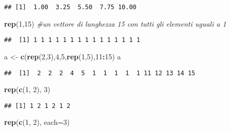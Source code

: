 \documentclass[
]{article}
\newenvironment{Shaded}{\begin{snugshade}}{\end{snugshade}}
\newcommand{\AttributeTok}[1]{\textcolor[rgb]{0.13,0.29,0.53}{#1}}
\newcommand{\CommentTok}[1]{\textcolor[rgb]{0.56,0.35,0.01}{\textit{#1}}}
\newcommand{\DecValTok}[1]{\textcolor[rgb]{0.00,0.00,0.81}{#1}}
\newcommand{\FunctionTok}[1]{\textcolor[rgb]{0.13,0.29,0.53}{\textbf{#1}}}
\newcommand{\NormalTok}[1]{#1}
\newcommand{\OtherTok}[1]{\textcolor[rgb]{0.56,0.35,0.01}{#1}}
\newcommand{\SpecialCharTok}[1]{\textcolor[rgb]{0.81,0.36,0.00}{\textbf{#1}}}
\begin{document}
\begin{verbatim}
## [1]  1.00  3.25  5.50  7.75 10.00
\end{verbatim}

\begin{Shaded}
\begin{Highlighting}[]
\FunctionTok{rep}\NormalTok{(}\DecValTok{1}\NormalTok{,}\DecValTok{15}\NormalTok{) }\CommentTok{\#un vettore di lunghezza 15 con tutti gli elementi uguali a 1}
\end{Highlighting}
\end{Shaded}

\begin{verbatim}
##  [1] 1 1 1 1 1 1 1 1 1 1 1 1 1 1 1
\end{verbatim}

\begin{Shaded}
\begin{Highlighting}[]
\NormalTok{a }\OtherTok{\textless{}{-}} \FunctionTok{c}\NormalTok{(}\FunctionTok{rep}\NormalTok{(}\DecValTok{2}\NormalTok{,}\DecValTok{3}\NormalTok{),}\DecValTok{4}\NormalTok{,}\DecValTok{5}\NormalTok{,}\FunctionTok{rep}\NormalTok{(}\DecValTok{1}\NormalTok{,}\DecValTok{5}\NormalTok{),}\DecValTok{11}\SpecialCharTok{:}\DecValTok{15}\NormalTok{)}
\NormalTok{a}
\end{Highlighting}
\end{Shaded}

\begin{verbatim}
##  [1]  2  2  2  4  5  1  1  1  1  1 11 12 13 14 15
\end{verbatim}

\begin{Shaded}
\begin{Highlighting}[]
\FunctionTok{rep}\NormalTok{(}\FunctionTok{c}\NormalTok{(}\DecValTok{1}\NormalTok{, }\DecValTok{2}\NormalTok{), }\DecValTok{3}\NormalTok{)}
\end{Highlighting}
\end{Shaded}

\begin{verbatim}
## [1] 1 2 1 2 1 2
\end{verbatim}

\begin{Shaded}
\begin{Highlighting}[]
\FunctionTok{rep}\NormalTok{(}\FunctionTok{c}\NormalTok{(}\DecValTok{1}\NormalTok{, }\DecValTok{2}\NormalTok{), }\AttributeTok{each=}\DecValTok{3}\NormalTok{)}
\end{Highlighting}
\end{Shaded}
\end{document}
